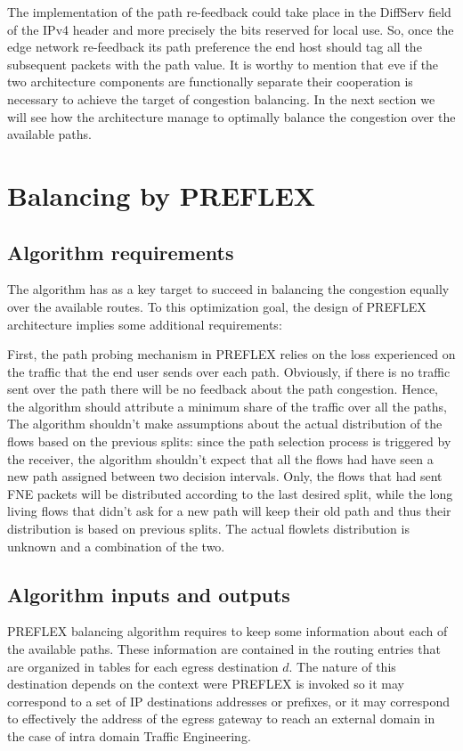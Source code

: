 The implementation of the path re-feedback could take place in the DiffServ field of the IPv4 header and more precisely the bits reserved for local use. So, once the edge network re-feedback its path preference the end host should tag all the subsequent packets with the path value.
It is worthy to mention that eve if the two architecture components are functionally separate their cooperation is necessary to achieve the target of congestion balancing. In the next section we will see how the architecture manage to optimally balance the congestion over the available paths.

\section{Balancing by PREFLEX}

\subsection{Algorithm requirements}
The algorithm has as a key target to succeed in balancing the congestion equally over the available routes. To this optimization goal, the design of PREFLEX architecture implies some additional requirements: 

First, the path probing mechanism in PREFLEX relies on the loss experienced on the traffic that the end user sends over each path. Obviously, if  there is no traffic sent over the path there will be no feedback about the path congestion. Hence, the algorithm should attribute a minimum share of the traffic over all the paths,
The algorithm shouldn't make assumptions about the actual distribution of the flows based on the previous splits: since the path selection process is triggered by the receiver, the algorithm shouldn't expect that all the flows had have seen a new path assigned between two decision intervals. Only, the flows that had sent FNE packets will be distributed according to the last desired split, while the long living flows that didn't ask for a new path will keep their old path and thus their distribution is based on previous splits. The actual flowlets distribution is unknown and a combination of the two.

\subsection{Algorithm inputs and outputs}

PREFLEX balancing algorithm requires to keep some information about each of the available paths. These information are contained in the routing entries that are organized in tables for each egress destination $d$. The nature of this destination depends on the context were PREFLEX is invoked so it may correspond to a set of IP destinations addresses or prefixes, or it may correspond to effectively the  address of the egress gateway to reach an external domain in the case of intra domain Traffic Engineering. 

